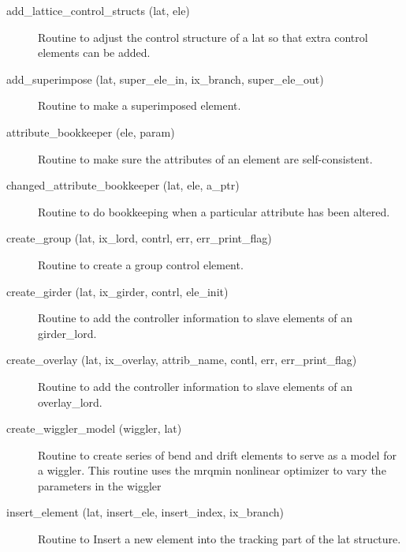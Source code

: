 \begin{description}

\label{r:add.lattice.control.structs}
\item[add_lattice_control_structs (lat, ele)] \Newline 
Routine to adjust the control structure of a lat so that extra control
elements can be added.

\label{r:add.superimpose}
\item[add_superimpose (lat, super_ele_in, ix_branch, super_ele_out)] \Newline
Routine to make a superimposed element. 

\label{r:attribute.bookkeeper}
\item[attribute_bookkeeper (ele, param)] \Newline
Routine to make sure the attributes of an element are self-consistent. 

\label{r:changed.attribute.bookkeeper}
\item[changed_attribute_bookkeeper (lat, ele, a_ptr)] \Newline 
Routine to do bookkeeping when a particular attribute has been altered.

\label{r:create.group}
\item[create_group (lat, ix_lord, contrl, err, err_print_flag)] \Newline
Routine to create a group control element. 

\label{r:create.girder}
\item[create_girder (lat, ix_girder, contrl, ele_init)] \Newline 
     Routine to add the controller information to slave elements of
     an girder_lord.

\label{r:create.overlay}
\item[create_overlay (lat, ix_overlay, attrib_name, contl, err, err_print_flag)] \Newline
Routine to add the controller information to slave elements of an 
overlay_lord. 

\label{r:create.wiggler.model}
\item[create_wiggler_model (wiggler, lat)] \Newline 
Routine to create series of bend and drift elements to serve as a model for a wiggler.
This routine uses the mrqmin nonlinear optimizer to vary the parameters in the wiggler 

\label{r:insert.element}
\item[insert_element (lat, insert_ele, insert_index, ix_branch)] \Newline
Routine to Insert a new element into the tracking part of the 
lat structure. 


\end{description}
